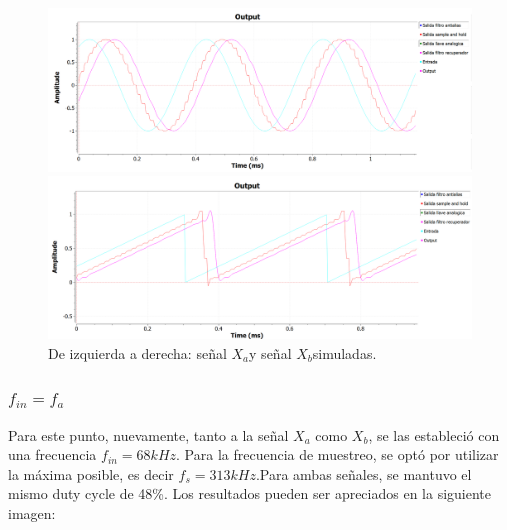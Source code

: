 \documentclass[../../ASSD_TP1_G7.tex]{subfiles}
\begin{document}
\begin{figure}[H]

\begin{centering}
\includegraphics[scale=0.5]{Imagenes/simulacion_syh_seno_b1.PNG}
\par\end{centering}
\begin{centering}
\includegraphics[scale=0.5]{Imagenes/simulacion_syh_diente_b1.PNG}\caption{De izquierda a derecha: señal $X_{a}$y señal $X_{b}$simuladas.}
\par\end{centering}
\end{figure}


\subsubsection{$f_{in}=f_{a}$}

Para este punto, nuevamente, tanto a la señal $X_{a}$ como $X_{b}$,
se las estableció con una frecuencia $f_{in}=68kHz$. Para la frecuencia
de muestreo, se optó por utilizar la máxima posible, es decir $f_{s}=313kHz.$Para
ambas señales, se mantuvo el mismo duty cycle de 48\%. Los resultados
pueden ser apreciados en la siguiente imagen:
\end{document}
